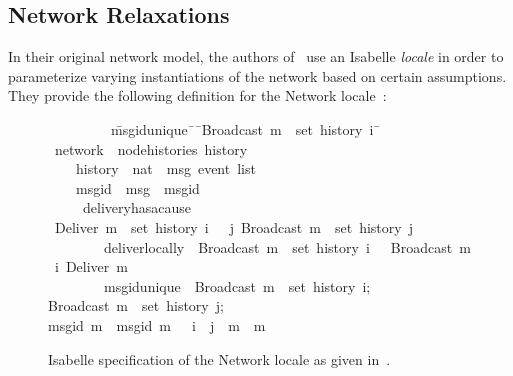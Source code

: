 \subsection{Network Relaxations}
In their original network model, the authors of~\citep{gomes17} use an Isabelle
\textit{locale} in order to parameterize varying instantiations of the network
based on certain assumptions. They provide the following definition for the
Network locale~\citep{gomes17}:
\begin{figure}[H]
\begin{isabelle}
~~~~~~~~\ \=msg{\isacharunderscore}id{\isacharunderscore}unique{\isacharcolon}\ \={\isasymrbrakk}\ \={\isachardoublequoteopen}Broadcast\ m\ {\isasymin}\ set\ {\isacharparenleft}history\ i{\isacharparenright}\ \=\kill
{}\ network\ {\isacharequal}\ node{\isacharunderscore}histories\ history\\
~~~~\>history\ {\isacharcolon}{\isacharcolon}\ {\isachardoublequoteopen}nat\ {\isasymRightarrow}\ {\isacharprime}msg\ event\ list{\isachardoublequoteclose}\ {\isacharplus}\\
~~~~\>msg{\isacharunderscore}id\ {\isacharcolon}{\isacharcolon}\ {\isachardoublequoteopen}{\isacharprime}msg\ {\isasymRightarrow}\ {\isacharprime}msgid{\isachardoublequoteclose}\\
~~~~\ delivery{\isacharunderscore}has{\isacharunderscore}a{\isacharunderscore}cause{\isacharcolon}\\
\>\>{\isasymlbrakk}\ {\isachardoublequoteopen}Deliver\ m\ {\isasymin}\ set\ {\isacharparenleft}history\ i{\isacharparenright}\ \>\>{\isasymrbrakk}\ {\isasymLongrightarrow}\ {\isasymexists}j{\isachardot}\ Broadcast\ m\ {\isasymin}\ set\ {\isacharparenleft}history\ j{\isacharparenright}{\isachardoublequoteclose}\\
~~~~~~~~\>deliver{\isacharunderscore}locally{\isacharcolon}\ \>{\isasymlbrakk}\ \>{\isachardoublequoteopen}Broadcast\ m\ {\isasymin}\ set\ {\isacharparenleft}history\ i{\isacharparenright}\ \>{\isasymrbrakk}\ {\isasymLongrightarrow}\  Broadcast\ m\ {\isasymsqsubset}\isactrlsup i\ Deliver\ m{\isachardoublequoteclose}\\
~~~~~~~~\>msg{\isacharunderscore}id{\isacharunderscore}unique{\isacharcolon}\ \>{\isasymlbrakk}\ \>{\isachardoublequoteopen}Broadcast\ m{}\ {\isasymin}\ set\ {\isacharparenleft}history\ i{\isacharparenright};\\
\>\>\>Broadcast\ m{}\ {\isasymin}\ set\ {\isacharparenleft}history\ j{\isacharparenright};\\
\>\>\>msg{\isacharunderscore}id\ m{}\ {\isacharequal}\ msg{\isacharunderscore}id\ m{}\ \>{\isasymrbrakk}\ {\isasymLongrightarrow}\ i\ {\isacharequal}\ j\ {\isasymand}\ m{}\ {\isacharequal}\ m{}{\isachardoublequoteclose}
\end{isabelle}
\centering
\caption{Isabelle specification of the Network locale as given
  in~\citep{gomes17}.}
\end{figure}

